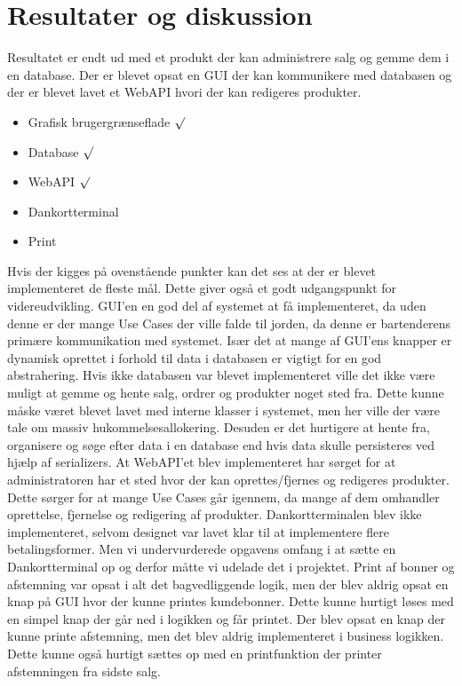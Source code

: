 \section{Resultater og diskussion}
Resultatet er endt ud med et produkt der kan administrere salg og gemme dem i en database. Der er blevet opsat en \gls{GUI} der kan kommunikere med databasen og der er blevet lavet et \gls{WebAPI} hvori der kan redigeres produkter. 

\begin{itemize}
	\item Grafisk brugergrænseflade $\surd$
	\item Database $\surd$
	\item \gls{WebAPI} $\surd$
	\item Dankortterminal
	\item Print
\end{itemize}  

Hvis der kigges på ovenstående punkter kan det ses at der er blevet implementeret de fleste mål. Dette giver også et godt udgangspunkt for videreudvikling. 
\gls{GUI}'en en god del af systemet at få implementeret, da uden denne er der mange Use Cases der ville falde til jorden, da denne er bartenderens primære kommunikation med systemet. Især det at mange af \gls{GUI}'ens knapper er dynamisk oprettet i forhold til data i databasen er vigtigt for en god abstrahering.\newline 
Hvis ikke databasen var blevet implementeret ville det ikke være muligt at gemme og hente salg, ordrer og produkter noget sted fra. Dette kunne måske været blevet lavet med interne klasser i systemet, men her ville der være tale om massiv hukommelsesallokering. Desuden er det hurtigere at hente fra, organisere og søge efter data i en database end hvis data skulle persisteres ved hjælp af serializers.  
\newline
\newline
At \gls{WebAPI}'et blev implementeret har sørget for at administratoren har et sted hvor der kan oprettes/fjernes og redigeres produkter. Dette sørger for at mange Use Cases går igennem, da mange af dem omhandler oprettelse, fjernelse og redigering af produkter.  
\newline
\newline
Dankortterminalen blev ikke implementeret, selvom designet var lavet klar til at implementere flere betalingsformer. Men vi undervurderede opgavens omfang i at sætte en Dankortterminal op og derfor måtte vi udelade det i projektet. 
\newline
\newline
Print af bonner og afstemning var opsat i alt det bagvedliggende logik, men der blev aldrig opsat en knap på \gls{GUI} hvor der kunne printes kundebonner. Dette kunne hurtigt løses med en simpel knap der går ned i logikken og får printet. Der blev opsat en knap der kunne printe afstemning, men det blev aldrig implementeret i business logikken. Dette kunne også hurtigt sættes op med en printfunktion der printer afstemningen fra sidste salg.  
 